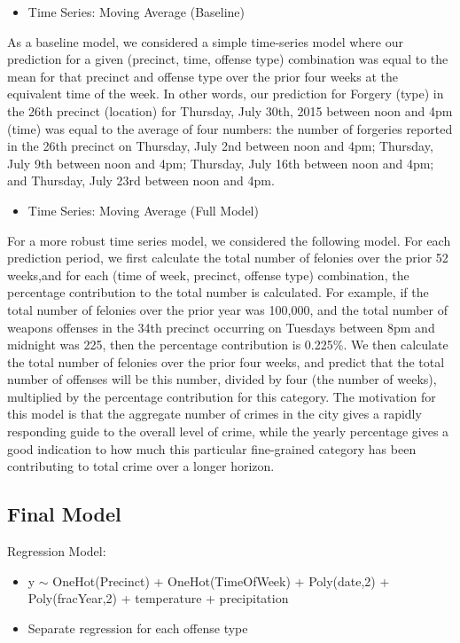 \documentclass[10pt,journal,compsoc]{IEEEtran}
\begin{document}
\begin{itemize}
  \item Time Series: Moving Average (Baseline)
\end{itemize}

As a baseline model, we considered a simple time-series model where our prediction for
a given (precinct, time, offense type) combination was equal to the mean for that
precinct and offense type over the prior four weeks at the equivalent time of the week.
In other words, our prediction for Forgery (type) in the 26th precinct (location) for
Thursday, July 30th, 2015 between noon and 4pm (time) was equal to the average of
four numbers: the number of forgeries reported in the 26th precinct on Thursday, July
2nd between noon and 4pm; Thursday, July 9th between noon and 4pm; Thursday, July
16th between noon and 4pm; and Thursday, July 23rd between noon and 4pm.\\

\begin{itemize}
  \item Time Series: Moving Average (Full Model)
\end{itemize}

For a more robust time series model, we considered the following model. For each
prediction period, we first calculate the total number of felonies over the prior 52 weeks,and for each (time of week, precinct, offense type) combination, the percentage
contribution to the total number is calculated. For example, if the total number of
felonies over the prior year was 100,000, and the total number of weapons offenses in
the 34th precinct occurring on Tuesdays between 8pm and midnight was 225, then the
percentage contribution is 0.225\%. We then calculate the total number of felonies over
the prior four weeks, and predict that the total number of offenses will be this number,
divided by four (the number of weeks), multiplied by the percentage contribution for this
category. The motivation for this model is that the aggregate number of crimes in the
city gives a rapidly responding guide to the overall level of crime, while the yearly
percentage gives a good indication to how much this particular fine-grained category
has been contributing to total crime over a longer horizon.

\subsection{Final Model}

Regression Model:
\begin{itemize}
  \item y $\sim$ OneHot(Precinct) + OneHot(TimeOfWeek) + Poly(date,2) + Poly(fracYear,2) + temperature + precipitation
  \item Separate regression for each offense type
\end{itemize}
\end{document}
